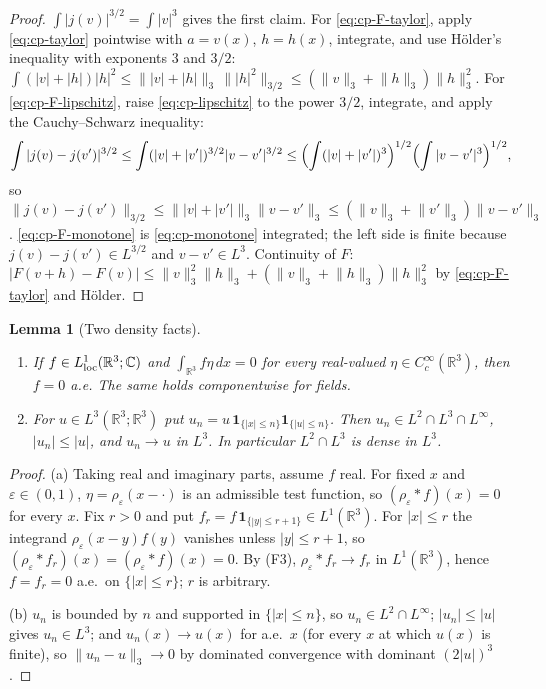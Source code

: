 \documentclass[11pt]{article}
\newtheorem{lemma}[theorem]{Lemma}
\theoremstyle{definition}
\theoremstyle{plain}
\newcommand{\R}{\mathbb R}
\newcommand{\norm}[1]{\lVert #1\rVert}
\begin{document}
\begin{proof}
$\int|j(v)|^{3/2}=\int|v|^3$ gives the first claim.  For
\eqref{eq:cp-F-taylor}, apply \eqref{eq:cp-taylor} pointwise with
$a=v(x)$, $h=h(x)$, integrate, and use H\"older's inequality with exponents
$3$ and $3/2$:
$\int(|v|+|h|)|h|^2\le\norm{|v|+|h|}_3\,\norm{|h|^2}_{3/2}
\le(\norm v_3+\norm h_3)\norm h_3^2$.  For \eqref{eq:cp-F-lipschitz},
raise \eqref{eq:cp-lipschitz} to the power $3/2$, integrate, and apply the
Cauchy--Schwarz inequality:
\[
 \int|j(v)-j(v')|^{3/2}
 \le\int(|v|+|v'|)^{3/2}|v-v'|^{3/2}
 \le\Bigl(\int(|v|+|v'|)^3\Bigr)^{1/2}\Bigl(\int|v-v'|^3\Bigr)^{1/2},
\]
so $\norm{j(v)-j(v')}_{3/2}\le\norm{|v|+|v'|}_3\norm{v-v'}_3
\le(\norm v_3+\norm{v'}_3)\norm{v-v'}_3$.  \eqref{eq:cp-F-monotone} is
\eqref{eq:cp-monotone} integrated; the left side is finite because
$j(v)-j(v')\in L^{3/2}$ and $v-v'\in L^3$.  Continuity of $F$:
$|F(v+h)-F(v)|\le\norm v_3^2\norm h_3+(\norm v_3+\norm h_3)\norm h_3^2$ by
\eqref{eq:cp-F-taylor} and H\"older.
\end{proof}

\begin{lemma}[Two density facts]\label{lem:density}\leavevmode
\begin{enumerate}
\item[(a)] If $f\in L^1_{\rm loc}(\R^3;\mathbb C)$ and
 $\int_{\R^3}f\eta\,dx=0$ for every real-valued $\eta\in C_c^\infty(\R^3)$,
 then $f=0$ a.e.  The same holds componentwise for fields.
\item[(b)] For $u\in L^3(\R^3;\R^3)$ put
 $u_n=u\,\mathbf 1_{\{|x|\le n\}}\mathbf 1_{\{|u|\le n\}}$.  Then
 $u_n\in L^2\cap L^3\cap L^\infty$, $|u_n|\le|u|$, and $u_n\to u$ in
 $L^3$.  In particular $L^2\cap L^3$ is dense in $L^3$.
\end{enumerate}
\end{lemma}

\begin{proof}
(a) Taking real and imaginary parts, assume $f$ real.  For fixed $x$ and
$\varepsilon\in(0,1)$, $\eta=\rho_\varepsilon(x-\cdot)$ is an admissible
test function, so $(\rho_\varepsilon*f)(x)=0$ for every $x$.  Fix $r>0$
and put $f_r=f\,\mathbf 1_{\{|y|\le r+1\}}\in L^1(\R^3)$.  For
$|x|\le r$ the integrand $\rho_\varepsilon(x-y)f(y)$ vanishes unless
$|y|\le r+1$, so $(\rho_\varepsilon*f_r)(x)=(\rho_\varepsilon*f)(x)=0$.
By (F3), $\rho_\varepsilon*f_r\to f_r$ in $L^1(\R^3)$, hence $f=f_r=0$
a.e.\ on $\{|x|\le r\}$; $r$ is arbitrary.

(b) $u_n$ is bounded by $n$ and supported in $\{|x|\le n\}$, so
$u_n\in L^2\cap L^\infty$; $|u_n|\le|u|$ gives $u_n\in L^3$; and
$u_n(x)\to u(x)$ for a.e.\ $x$ (for every $x$ at which $u(x)$ is finite),
so $\norm{u_n-u}_3\to0$ by dominated convergence with dominant $(2|u|)^3$.
\end{proof}
\end{document}
